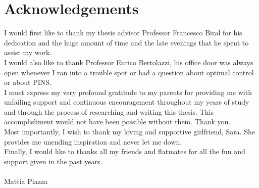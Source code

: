 \chapter*{Acknowledgements}
%
I would first like to thank my thesis advisor Professor Francesco Biral for his dedication and the huge amount of time and the late evenings that he spent to assist my work.\\ 
%
I would also like to thank Professor Enrico Bertolazzi, his office door was always open whenever I ran into a trouble spot or had a question about optimal control or about PINS.\\
%
I must express my very profound gratitude to my parents for providing me with unfailing support and continuous encouragement throughout my years of study and through the process of researching and writing this thesis. This accomplishment would not have been possible without them. Thank you.\\
%
Most importantly, I wish to thank my loving and supportive girlfriend, Sara. She provides me unending inspiration and never let me down.\\
%
Finally, I would like to thanks all my friends and flatmates for all the fun and support given in the past years.\\
%
\vspace{0cm}\\
Mattia Piazza
